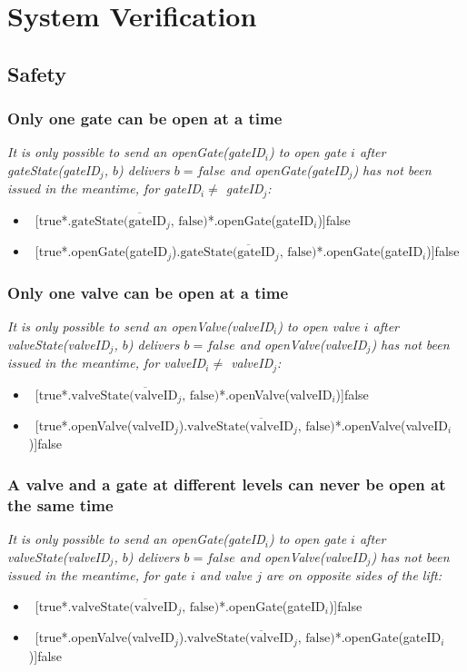 \section{System Verification}
\subsection{Safety}
\subsubsection{Only one gate can be open at a time}
\textit{It is only possible to send an openGate(gateID$_i$) to open gate $i$ after gateState(gateID$_j$, $ b $) delivers $b = false$ and openGate(gateID$_j$) has not been issued in the meantime, for gateID$_i \neq$ gateID$_j$:}
	\begin{itemize}
		\item ~[true*.$\overline{\textrm{gateState(gateID$_j$, false)}}$*.openGate(gateID$_i$)]false
		\item ~[true*.openGate(gateID$_j$).$\overline{\textrm{gateState(gateID$_j$, false)}}$*.openGate(gateID$_i$)]false
	\end{itemize}	
	
\subsubsection{Only one valve can be open at a time}
\textit{It is only possible to send an openValve(valveID$_i$) to open valve $i$ after valveState(valveID$_j$, $ b $) delivers $b = false$ and openValve(valveID$_j$) has not been issued in the meantime, for valveID$_i \neq$ valveID$_j$:}
	\begin{itemize}
		\item ~[true*.$\overline{\textrm{valveState(valveID$_j$, false)}}$*.openValve(valveID$_i$)]false
		\item ~[true*.openValve(valveID$_j$).$\overline{\textrm{valveState(valveID$_j$, false)}}$*.openValve(valveID$_i$)]false
	\end{itemize}
	
\subsubsection{A valve and a gate at different levels can never be open at the same time}
\textit{It is only possible to send an openGate(gateID$_i$) to open gate $i$ after valveState(valveID$_j$, $ b $) delivers $b = false$ and openValve(valveID$_j$) has not been issued in the meantime, for gate $i$ and valve $j$ are on opposite sides of the lift:}
	\begin{itemize}
		\item ~[true*.$\overline{\textrm{valveState(valveID$_j$, false)}}$*.openGate(gateID$_i$)]false
		\item ~[true*.openValve(valveID$_j$).$\overline{\textrm{valveState(valveID$_j$, false)}}$*.openGate(gateID$_i$)]false
	\end{itemize}

